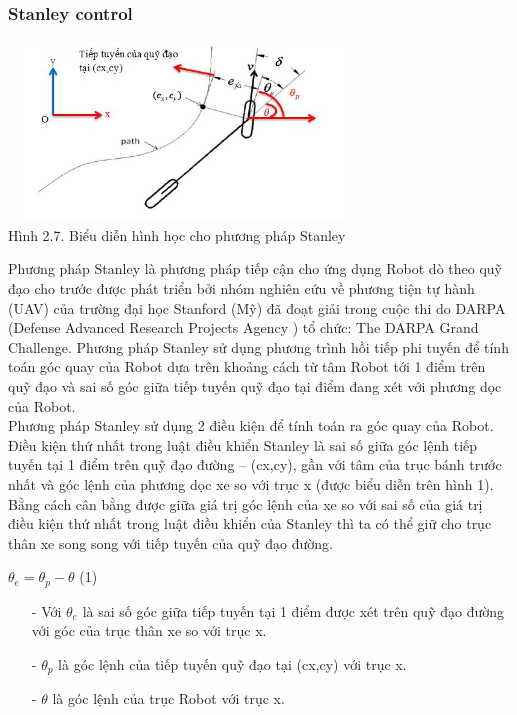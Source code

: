 \documentclass[a4paper, 12pt]{article}
\begin{document}
\subsubsection{Stanley control}
\hspace{0.5cm}
\begin{center}
	\includegraphics[width=350px,height=180px]{images/Stanley}\\
	Hình 2.7. Biểu diễn hình học cho phương pháp Stanley
\end{center}
\hspace{0.5cm}
Phương pháp Stanley là phương pháp tiếp cận cho ứng dụng Robot dò theo quỹ đạo cho trước được phát triển bởi nhóm nghiên cứu về phương tiện tự hành (UAV) của trường đại học Stanford (Mỹ) đã đoạt giải trong cuộc thi do DARPA (Defense Advanced Research Projects Agency ) tổ chức: The DARPA Grand Challenge. Phương pháp Stanley sử dụng phương trình hồi tiếp phi tuyến để tính toán góc quay của Robot dựa trên khoảng cách từ tâm Robot tới 1 điểm trên quỹ đạo và sai số góc giữa tiếp tuyến quỹ đạo tại điểm đang xét với phương dọc của Robot.\\\indent
Phương pháp Stanley sử dụng 2 điều kiện để tính toán ra góc quay của Robot. Điều kiện thứ nhất trong luật điều khiển Stanley là sai số giữa góc lệnh tiếp tuyến tại 1 điểm trên quỹ đạo đường – (cx,cy), gần với tâm của trục bánh trước nhất và góc lệnh của phương dọc xe so với trục x (được biểu diễn trên hình 1). Bằng cách cân bằng được giữa giá trị góc lệnh của xe so với sai số của giá trị điều kiện thứ nhất trong luật điều khiển của Stanley thì ta có thể giữ cho trục thân xe song song với tiếp tuyến của quỹ đạo đường.\\
\begin{center}
	$\theta_{e} = \theta_{p} - \theta$ (1)
\end{center}
\begin{enumerate}
	\item[-] Với $\theta_{e}$ là sai số góc giữa tiếp tuyến tại 1 điểm được xét trên quỹ đạo đường với góc của trục thân xe so với trục x.
	\item[-] $\theta_{p}$ là góc lệnh của tiếp tuyến quỹ đạo tại (cx,cy) với trục x.
	\item[-] $\theta$ là góc lệnh của trục Robot với trục x.
\end{enumerate}
\end{document}
